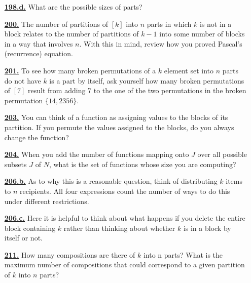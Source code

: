 \documentclass[10pt,]{book}
\theoremstyle{plain}
\theoremstyle{definition}
\theoremstyle{definition}
\theoremstyle{definition}
\numberwithin{equation}{chapter}
\begin{document}
\begin{itemize}[itemsep=1em]
\hypertarget{a-198.d}{}\item[\textbf{\hyperref[task-210]{198.d.}}]
\hypertarget{p-1082}{}%
What are the possible sizes of parts?%

\hypertarget{a-200}{}\item[\textbf{\hyperref[secondstirlingrecurrence]{200.}}]
\hypertarget{p-1089}{}%
The number of partitions of \([k]\) into \(n\) parts in which \(k\) is not in a block relates to the number of partitions of \(k-1\) into some number of blocks in a way that involves \(n\). With this in mind, review how you proved Pascal's (recurrence) equation.%

\hypertarget{a-201}{}\item[\textbf{\hyperref[activity-194]{201.}}]
\hypertarget{p-1092}{}%
To see how many broken permutations of a \(k\) element set into \(n\) parts do not have \(k\) is a part by itself, ask yourself how many broken permutations of \([7]\) result from adding 7 to the one of the two permutations in the broken permutation \(\{14, 2356\}\).%

\hypertarget{a-203}{}\item[\textbf{\hyperref[activity-196]{203.}}]
\hypertarget{p-1098}{}%
You can think of a function as assigning values to the blocks of its partition. If you permute the values assigned to the blocks, do you always change the function?%

\hypertarget{a-204}{}\item[\textbf{\hyperref[Stirlingfalling]{204.}}]
\hypertarget{p-1102}{}%
When you add the number of functions mapping onto \(J\) over all possible subsets \(J\) of \(N\), what is the set of functions whose size you are computing?%

\hypertarget{a-206.b}{}\item[\textbf{\hyperref[task-214]{206.b.}}]
\hypertarget{p-1111}{}%
As to why this is a reasonable question, think of distributing \(k\) items to \(n\) recipients.  All four expressions count the number of ways to do this under different restrictions.%

\hypertarget{a-206.c}{}\item[\textbf{\hyperref[task-215]{206.c.}}]
\hypertarget{p-1113}{}%
Here it is helpful to think about what happens if you delete the entire block containing \(k\) rather than thinking about whether \(k\) is in a block by itself or not.%

\hypertarget{a-211}{}\item[\textbf{\hyperref[activity-204]{211.}}]
\hypertarget{p-1131}{}%
How many compositions are there of \(k\) into n parts? What is the maximum number of compositions that could correspond to a given partition of \(k\) into \(n\) parts?%


\end{itemize}
\end{document}
